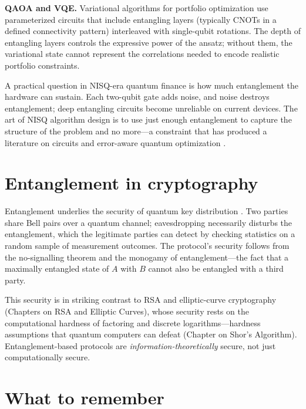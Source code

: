 \textbf{QAOA and VQE.} Variational algorithms for portfolio optimization \citep{thomassin_quantum_2025,zaman_po-qa_2024,morapakula_end--end_2026} use parameterized circuits that include entangling layers (typically CNOTs in a defined connectivity pattern) interleaved with single-qubit rotations. The depth of entangling layers controls the expressive power of the ansatz; without them, the variational state cannot represent the correlations needed to encode realistic portfolio constraints.

A practical question in NISQ-era quantum finance is how much entanglement the hardware can sustain. Each two-qubit gate adds noise, and noise destroys entanglement; deep entangling circuits become unreliable on current devices. The art of NISQ algorithm design is to use just enough entanglement to capture the structure of the problem and no more---a constraint that has produced a literature on  circuits and error-aware quantum optimization \citep{cerezo_variational_2021}.

\section{Entanglement in cryptography}

Entanglement underlies the security of  quantum key distribution \citep{bennett_quantum_2014}. Two parties share Bell pairs over a quantum channel; eavesdropping necessarily disturbs the entanglement, which the legitimate parties can detect by checking statistics on a random sample of measurement outcomes. The protocol's security follows from the no-signalling theorem and the monogamy of entanglement---the fact that a maximally entangled state of $A$ with $B$ cannot also be entangled with a third party.

This security is in striking contrast to RSA and elliptic-curve cryptography (Chapters on RSA and Elliptic Curves), whose security rests on the computational hardness of factoring and discrete logarithms---hardness assumptions that quantum computers can defeat (Chapter on Shor's Algorithm). Entanglement-based protocols are \emph{information-theoretically} secure, not just computationally secure.

\section{What to remember}

